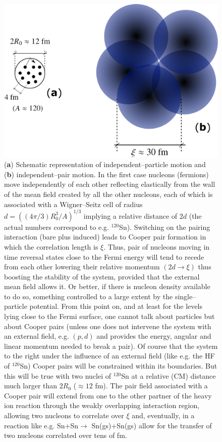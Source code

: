 \begin{figure}
\centerline{\includegraphics*[width=14cm,angle=0]{nutshell/figs/fig3_1_4.pdf}}
\caption{(\textbf{a}) Schematic representation of independent--particle motion and (\textbf{b}) independent--pair motion. In the first case nucleons (fermions) move independently of each other reflecting elastically from the wall of the mean field created by all the other nucleons, each of which is associated with a Wigner--Seitz cell of radius $d=\left((4\pi/3)R_0^3/A\right)^{1/3}$ implying a relative distance of $2d$ (the actual numbers correspond to e.g. $^{120}$Sn). Switching on the pairing interaction (bare plus induced) leads to Cooper pair formation in which the correlation length is $\xi$. Thus, pair of nucleons moving in time reversal states close to the Fermi energy will tend to recede from each other lowering their relative momentum $(2d\rightarrow \xi)$ thus boosting the stability of the system, provided that the external mean field allows it. Or better, if  there is nucleon density available to do so, something controlled to a large extent by the single--particle potential. From this point on, and at least for the levels lying close to the Fermi surface, one cannot talk about particles but about Cooper pairs (unless one does not intervene the system with an external field, e.g. $(p,d)$ and provides the energy, angular and linear momentum needed to break a pair). Of course that the system to the right under the influence of an external field (like e.g. the HF of $^{120}$Sn) Cooper pairs will be constrained within its boundaries. But this will be true with two nuclei of $^{120}$Sn at a relative (CM) distance much larger than $2R_0$ ($\approx 12$ fm). The pair field associated with a Cooper pair will extend from one to the other partner of the heavy ion reaction through the weakly overlapping interaction region, allowing two nucleons to correlate over $\xi$ and, eventually, in a reaction like e.g. Sn+Sn$\rightarrow$ Sn(gs)+Sn(gs) allow for the transfer of two nucleons correlated over tens of fm.}\label{fig3.2.1}
\end{figure}
